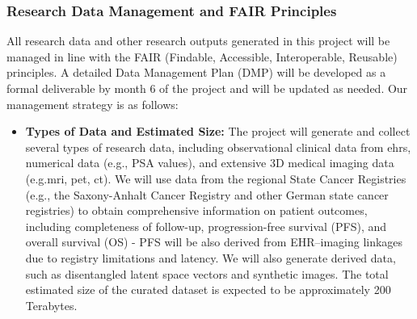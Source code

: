 \documentclass[11pt, a4paper]{article}
\begin{document}
\subsubsection{Research Data Management and FAIR Principles}
All research data and other research outputs generated in this project will be managed in line with the FAIR (Findable, Accessible, Interoperable, Reusable) principles. A detailed Data Management Plan (DMP) will be developed as a formal deliverable by month 6 of the project and will be updated as needed. Our management strategy is as follows:


\begin{itemize}
    \item \textbf{Types of Data and Estimated Size:} The project will generate and collect several types of research data, including observational clinical data from \gls{ehr}s, numerical data (e.g., PSA values), and extensive 3D medical imaging data (e.g.\gls{mri}, \gls{pet}, \gls{ct}). We will use data from the regional State Cancer Registries (e.g., the Saxony-Anhalt Cancer Registry and other German state cancer registries) to obtain comprehensive information on patient outcomes, including completeness of follow-up, progression-free survival (PFS), and overall survival (OS) - PFS will be also derived from EHR–imaging linkages due to registry limitations and latency. We will also generate derived data, such as disentangled latent space vectors and synthetic images. The total estimated size of the curated dataset is expected to be approximately 200 Terabytes.
\end{itemize}
\end{document}
